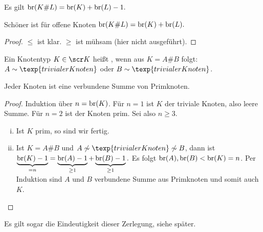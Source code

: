 \begin{st}[Schubert 195x]
    Es gilt
    \begin{math}
        \operatorname { br }(K \# L) = \operatorname { br }(K) + \operatorname { br }(L) - 1.
    \end{math}
    \begin{note}
        Schöner ist für offene Knoten
        \begin{math}
            \operatorname { br }(K \# L) = \operatorname { br }(K) + \operatorname { br }(L).
        \end{math}
    \end{note}
    \begin{proof}
        $\le$ ist klar.
        $\ge$ ist mühsam (hier nicht ausgeführt).
    \end{proof}
\end{st}

\begin{df}
    Ein Knotentyp $K \in \scr K$ heißt , wenn aus $K = A \# B$ folgt: $A \sim \texp{trivialer Knoten}$ oder $B \sim \texp{trivialer Knoten}$.
\end{df}

\begin{kor}
    Jeder Knoten ist eine verbundene Summe von Primknoten.
    \begin{proof}
        Induktion über $n = \operatorname { br }(K)$.
        Für $n = 1$ ist $K$ der triviale Knoten, also leere Summe.
        Für $n = 2$ ist der Knoten prim.
        Sei also $n \ge 3$.
        \begin{enumerate}[i)]
            \item
                Ist $K$ prim, so sind wir fertig.
            \item
                Ist $K = A \# B$ und $A \not\sim \texp{trivialer Knoten} \not\sim B$, dann ist
                \begin{math}
                    \underbrace{\operatorname { br }(K) -1}_{=n} = \underbrace{\operatorname { br }(A) - 1}_{\ge 1} + \underbrace{\operatorname { br }(B) - 1}_{\ge 1}.
                \end{math}
                Es folgt $\operatorname { br }(A), \operatorname { br }(B) < \operatorname { br }(K) = n$.
                Per Induktion sind $A$ und $B$ verbundene Summe aus Primknoten und somit auch $K$.
        \end{enumerate}
    \end{proof}
    \begin{note}
        Es gilt sogar die Eindeutigkeit dieser Zerlegung, siehe später. %
    \end{note}
\end{kor}

